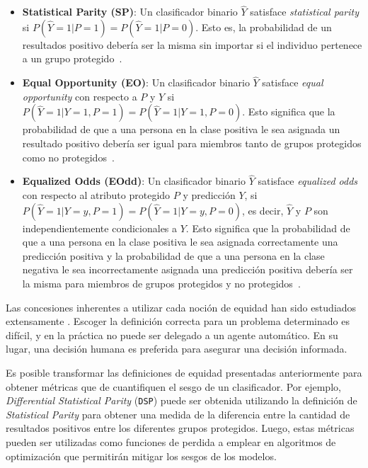  \begin{itemize}
     \item \textbf{Statistical Parity (SP)}: Un clasificador binario $\hat{Y}$ satisface \emph{statistical parity} si $P(\hat{Y}=1|P=1) = P(\hat{Y}=1|P=0)$.
     Esto es, la probabilidad de un resultados positivo debería ser la misma sin importar si el individuo pertenece a un grupo protegido~\parencite{verma2018fairness}.
     \item \textbf{Equal Opportunity (EO)}: Un clasificador binario $\hat{Y}$ satisface \emph{equal opportunity} con respecto a $P$ y $Y$ si $P(\hat{Y}=1|Y=1,P=1) = P(\hat{Y}=1|Y=1,P=0)$.
     Esto significa que la probabilidad de que a una persona en la clase positiva le sea asignada un resultado positivo debería ser igual para miembros tanto de grupos protegidos como no protegidos~\parencite{verma2018fairness}.
     \item \textbf{Equalized Odds (EOdd)}: Un clasificador binario $\hat{Y}$ satisface \emph{equalized odds} con respecto al atributo protegido $P$ y predicción $Y$, si $P(\hat{Y}=1|Y=y,P=1) = P(\hat{Y}=1|Y=y,P=0)$, es decir, $\hat{Y}$ y $P$ son independientemente condicionales a $Y$.
     Esto significa que la probabilidad de que a una persona en la clase positiva le sea asignada correctamente una predicción positiva y la probabilidad de que a una persona en la clase negativa le sea incorrectamente asignada una predicción positiva debería ser la misma para miembros de grupos protegidos y no protegidos~\parencite{verma2018fairness}.
 \end{itemize}

Las concesiones inherentes a utilizar cada noción de equidad han sido estudiados extensamente \parencite{dwork2012fairness, friedler2016possibility, kleinberg2018inherent}.
Escoger la definición correcta para un problema determinado es difícil, y en la práctica no puede ser delegado a un agente automático.
En su lugar, una decisión humana es preferida para asegurar una decisión informada.

Es posible transformar las definiciones de equidad presentadas anteriormente para obtener métricas que de cuantifiquen el sesgo de un clasificador.
Por ejemplo, \emph{Differential Statistical Parity} (\texttt{DSP}) puede ser obtenida utilizando la definición de \emph{Statistical Parity} para obtener una medida de la diferencia entre la cantidad de resultados positivos entre los diferentes grupos protegidos.
Luego, estas métricas pueden ser utilizadas como funciones de perdida a emplear en algoritmos de optimización que permitirán mitigar los sesgos de los modelos.


